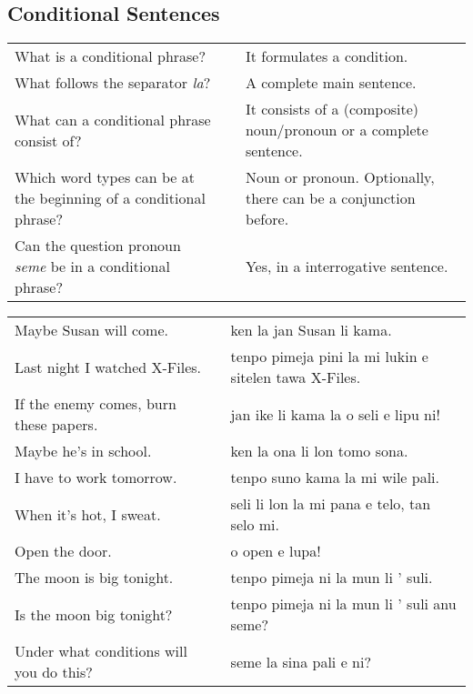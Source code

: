 \newpage

\subsection*{Conditional Sentences}
\label{'la'}


\begin{supertabular}{p{5,5cm}|ll}
    What is a conditional phrase?                                      &  & It formulates a condition.                                        \\
    What follows the separator \textit{la}?                            &  & A complete main sentence.                                         \\
    What can a conditional phrase consist of?                          &  & It consists of a (composite) noun/pronoun or a complete sentence. \\
    Which word types can be at the beginning of a conditional phrase?  &  & Noun or pronoun. Optionally, there can be a conjunction before.   \\
    Can the question pronoun \textit{seme} be in a conditional phrase? &  & Yes, in a interrogative sentence.                                 \\
\end{supertabular}

\begin{supertabular}{p{5,5cm}|ll}
    Maybe Susan will come.                  &  & ken la jan Susan li kama.                             \\
    Last night I watched X-Files.           &  & tenpo pimeja pini la mi lukin e sitelen tawa X-Files. \\
    If the enemy comes, burn these papers.  &  & jan ike li kama la o seli e lipu ni!                  \\
    Maybe he's in school.                   &  & ken la ona li lon tomo sona.                          \\
    I have to work tomorrow.                &  & tenpo suno kama la mi wile pali.                      \\
    When it's hot, I sweat.                 &  & seli li lon la mi pana e telo, tan selo mi.           \\
    Open the door.                          &  & o open e lupa!                                        \\
    The moon is big tonight.                &  & tenpo pimeja ni la mun li ' suli.                     \\
    Is the moon big tonight?                &  & tenpo pimeja ni la mun li ' suli anu seme?            \\
    Under what conditions will you do this? &  & seme la sina pali e ni?                               \\
\end{supertabular}

